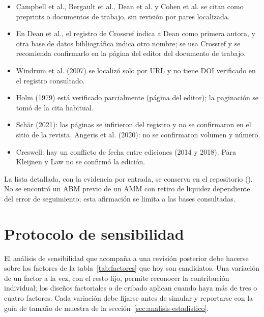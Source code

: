 \begin{itemize}
  \item Campbell et al., Bergault et al., Dean et al. y Cohen et al. se citan como preprints o documentos de trabajo, sin revisión por pares localizada.
  \item En Dean et al., el registro de Crossref indica a Dean como primera autora, y otra base de datos bibliográfica indica otro nombre; se usa Crossref y se recomienda confirmarlo en la página del editor del documento de trabajo.
  \item Windrum et al. (2007) se localizó solo por URL y no tiene DOI verificado en el registro consultado.
  \item Holm (1979) está verificado parcialmente (página del editor); la paginación se tomó de la cita habitual.
  \item Schär (2021): las páginas se infirieron del registro y no se confirmaron en el sitio de la revista. Angeris et al. (2020): no se confirmaron volumen y número.
  \item Creswell: hay un conflicto de fecha entre ediciones (2014 y 2018). Para Kleijnen y Law no se confirmó la edición.
\end{itemize}

La lista detallada, con la evidencia por entrada, se conserva en el repositorio (). No se encontró un ABM previo de un AMM con retiro de liquidez dependiente del error de seguimiento; esta afirmación se limita a las bases consultadas.

\section{Protocolo de sensibilidad}
\label{sec:sensibilidad}

El análisis de sensibilidad que acompaña a una revisión posterior debe hacerse sobre los factores de la tabla~\ref{tab:factores} que hoy son candidatos. Una variación de un factor a la vez, con el resto fijo, permite reconocer la contribución individual; los diseños factoriales o de cribado \cite{morris1991factorial,saltelli2010variance} aplican cuando haya más de tres o cuatro factores. Cada variación debe fijarse antes de simular y reportarse con la guía de tamaño de muestra de la sección~\ref{sec:analisis-estadistico}.
